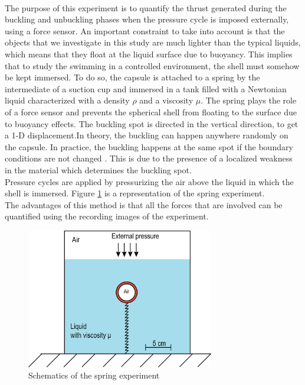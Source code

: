 \paragraph{}
The purpose of this experiment is to quantify the thrust generated during the buckling and unbuckling phases when the pressure cycle is imposed externally, using a force sensor. An important constraint to take into account is that the objects that we investigate in this study are much lighter than the typical liquids, which means that they float at the liquid surface due to buoyancy. This implies that to study the swimming in a controlled environment, the shell must somehow be kept immersed. To do so, the capsule is attached to a spring by the intermediate of a suction cup and immersed in a tank filled with a Newtonian liquid characterized with a density $\rho$ and a viscosity $\mu$. The spring plays the role of a force sensor and prevents the spherical shell from floating to the surface due to buoyancy effects.  The buckling spot is directed in the vertical direction, to get a 1-D displacement.In theory, the buckling can happen anywhere randomly on the capsule. In practice, the buckling happens at the same spot if the boundary conditions are not changed \cite{lee16,zhang16}. This is due to the presence of a localized weakness in the material which determines the buckling spot.\\
Pressure cycles are applied by pressurizing the air above the liquid in which the shell is immersed. Figure \ref{fig:spring_experiment_schematic} is a representation of the spring experiment.\\
The advantages of this method is that all the forces that are involved can be quantified using the recording images of the experiment.
\begin{figure}[H] %
	\centering%
  \includegraphics[width=0.73\textwidth]{figures/Chapter_1/schematic_experimental_setup.png}
	\caption{Schematics of the spring experiment}
	\label{fig:spring_experiment_schematic}
\end{figure}

